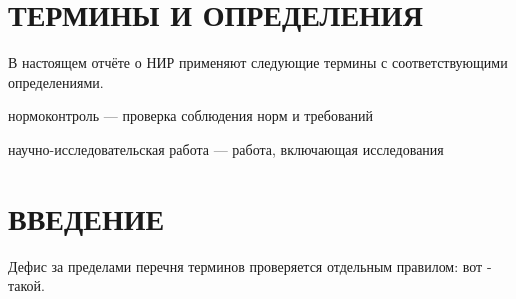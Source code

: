 \section*{ТЕРМИНЫ И ОПРЕДЕЛЕНИЯ}

В настоящем отчёте о НИР применяют следующие термины с соответствующими
определениями.

нормоконтроль — проверка соблюдения норм и требований

научно-исследовательская работа — работа, включающая исследования

\section*{ВВЕДЕНИЕ}

Дефис за пределами перечня терминов проверяется отдельным правилом: вот - такой.

